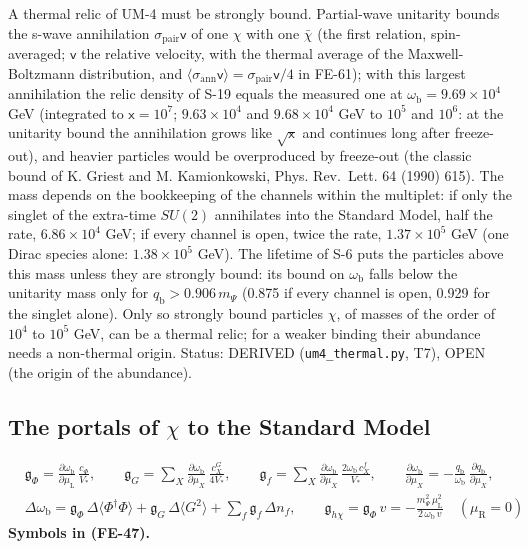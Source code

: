 \documentclass[
  10pt,
]{article}
\begin{document}
A thermal relic of UM-4 must be strongly bound. Partial-wave unitarity
bounds the s-wave annihilation \(\sigma_{\mathrm{pair}}\mathsf{v}\) of
one \(\chi\) with one \(\bar\chi\) (the first relation, spin-averaged;
\(\mathsf{v}\) the relative velocity, with the thermal average of the
Maxwell-Boltzmann distribution, and
\(\langle\sigma_{\mathrm{ann}}\mathsf{v}\rangle = \sigma_{\mathrm{pair}}\mathsf{v}/4\)
in FE-61); with this largest annihilation the relic density of S-19
equals the measured one at \(\omega_{\mathrm{b}} = 9.69\times10^4\) GeV
(integrated to \(\mathsf{x} = 10^7\); \(9.63\times10^4\) and
\(9.68\times10^4\) GeV to \(10^5\) and \(10^6\): at the unitarity bound
the annihilation grows like \(\sqrt{\mathsf{x}}\) and continues long
after freeze-out), and heavier particles would be overproduced by
freeze-out (the classic bound of K. Griest and M. Kamionkowski, Phys.
Rev.~Lett. 64 (1990) 615). The mass depends on the bookkeeping of the
channels within the multiplet: if only the singlet of the extra-time
\(SU(2)\) annihilates into the Standard Model, half the rate,
\(6.86\times10^4\) GeV; if every channel is open, twice the rate,
\(1.37\times10^5\) GeV (one Dirac species alone: \(1.38\times10^5\)
GeV). The lifetime of S-6 puts the particles above this mass unless they
are strongly bound: its bound on \(\omega_{\mathrm{b}}\) falls below the
unitarity mass only for \(q_{\mathrm{b}} > 0.906\,m_\Psi\) (0.875 if
every channel is open, 0.929 for the singlet alone). Only so strongly
bound particles \(\chi\), of masses of the order of \(10^4\) to \(10^5\)
GeV, can be a thermal relic; for a weaker binding their abundance needs
a non-thermal origin. Status: DERIVED (\texttt{um4\_thermal.py}, T7),
OPEN (the origin of the abundance).

\hypertarget{the-portals-of-chi-to-the-standard-model}{%
\subsection{\texorpdfstring{The portals of \(\chi\) to the Standard
Model}{The portals of \textbackslash chi to the Standard Model}}\label{the-portals-of-chi-to-the-standard-model}}

\[
\begin{aligned}
&\mathfrak{g}_{\Phi} = \frac{\partial\omega_{\mathrm{b}}}{\partial\mu_{\mathrm{L}}}\,\frac{c_\Phi}{V_*},\qquad
 \mathfrak{g}_{G} = \sum_X\frac{\partial\omega_{\mathrm{b}}}{\partial\mu_X}\,\frac{c^{G}_X}{4V_*},\qquad
 \mathfrak{g}_{f} = \sum_X\frac{\partial\omega_{\mathrm{b}}}{\partial\mu_X}\,\frac{2\omega_{\mathrm{b}}\,c^{f}_X}{V_*},\qquad
 \frac{\partial\omega_{\mathrm{b}}}{\partial\mu_X} = -\frac{q_{\mathrm{b}}}{\omega_{\mathrm{b}}}\,\frac{\partial q_{\mathrm{b}}}{\partial\mu_X},\\
&\Delta\omega_{\mathrm{b}} = \mathfrak{g}_{\Phi}\,\Delta\langle\Phi^\dagger\Phi\rangle + \mathfrak{g}_{G}\,\Delta\langle G^2\rangle + \sum_f\mathfrak{g}_{f}\,\Delta n_f,\qquad
 \mathfrak{g}_{h\chi} = \mathfrak{g}_{\Phi}\,v = -\frac{m_\Psi^2\,\mu_{\mathrm{L}}^2}{2\,\omega_{\mathrm{b}}\,v}\quad(\mu_{\mathrm{R}} = 0)
\end{aligned} \tag{FE-47}
\] \textbf{Symbols in (FE-47).}
\end{document}
